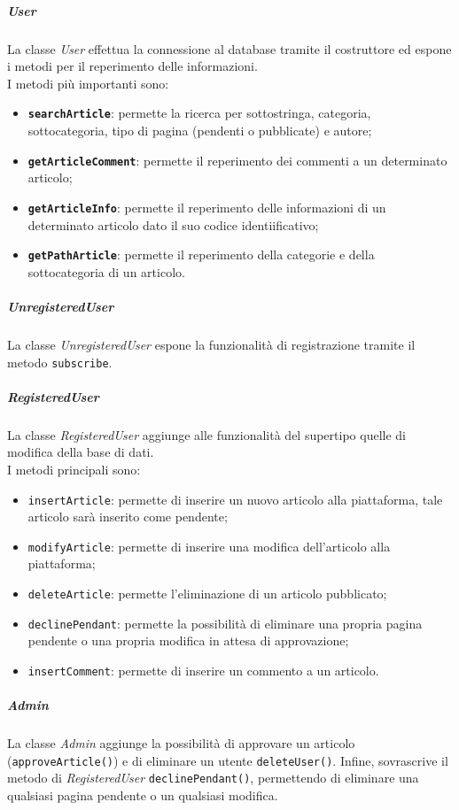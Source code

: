 \subparagraph{User} 
La classe \textit{User} effettua la connessione al database tramite il costruttore ed espone i metodi per il reperimento delle informazioni.\\
I metodi più importanti sono:
\begin{itemize}
	\item \textbf{\texttt{searchArticle}}: permette la ricerca per sottostringa, categoria, sottocategoria, tipo di pagina (pendenti o pubblicate) e autore;
	\item \textbf{\texttt{getArticleComment}}: permette il reperimento dei commenti a un determinato articolo;
	\item \textbf{\texttt{getArticleInfo}}: permette il reperimento delle informazioni di un determinato articolo dato il suo codice identiificativo;
	\item \textbf{\texttt{getPathArticle}}: permette il reperimento della categorie e della sottocategoria di un articolo.
\end{itemize}

\subparagraph{UnregisteredUser} 
La classe \textit{UnregisteredUser} espone la funzionalità di registrazione tramite il metodo \texttt{subscribe}.

\subparagraph{RegisteredUser} 
La classe \textit{RegisteredUser} aggiunge alle funzionalità del supertipo quelle di modifica della base di dati.\\
I metodi principali sono:
\begin{itemize}
	\item \texttt{insertArticle}: permette di inserire un nuovo articolo alla piattaforma, tale articolo sarà inserito come pendente;
	\item \texttt{modifyArticle}: permette di inserire una modifica dell'articolo alla piattaforma;
	\item \texttt{deleteArticle}: permette l'eliminazione di un articolo pubblicato;
	\item \texttt{declinePendant}: permette la possibilità di eliminare una propria pagina pendente o una propria modifica in attesa di approvazione;
	\item \texttt{insertComment}: permette di inserire un commento a un articolo.
\end{itemize}

\subparagraph{Admin}
La classe \textit{Admin} aggiunge la possibilità di approvare un articolo (\texttt{approveArticle()}) e di eliminare un utente \texttt{deleteUser()}. Infine, sovrascrive il metodo di \textit{RegisteredUser} \texttt{declinePendant()}, permettendo di eliminare una qualsiasi pagina pendente o un qualsiasi modifica.

